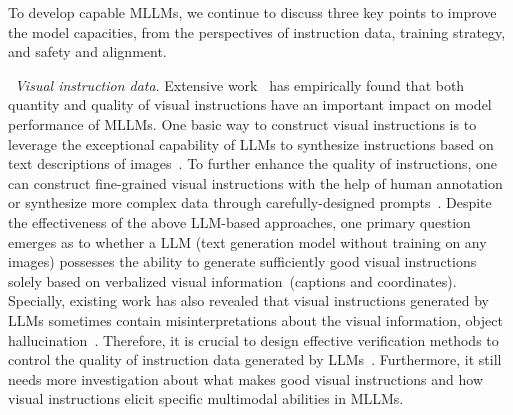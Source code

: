 {
To develop capable MLLMs, we continue to discuss three key points to improve the model capacities, from the perspectives of instruction data, training strategy, and safety and alignment.  

\textbullet~\emph{Visual instruction data}. 
{%
Extensive work~\cite{Liu-arxiv-2023-improved,Wang-arxiv-2023-To} has empirically found that both quantity and quality of visual instructions have an important impact on model performance of MLLMs. One basic way to construct visual instructions is to leverage the exceptional capability of LLMs to synthesize instructions  based on text descriptions of images~\cite{Liu-2023-arxiv-Visual}. %
To further enhance the quality of instructions, one can 
construct fine-grained visual instructions with the help of human annotation~\cite{Chen-arxiv-2023-shikra,Zhang-arxiv-2023-LLaVAR} or synthesize more complex data through carefully-designed prompts~\cite{Du-arxiv-2023-What}. 
Despite the effectiveness of the above LLM-based approaches, 
one primary question emerges as to whether a LLM (\ie text generation model without training on any images) possesses the ability to generate sufficiently good visual instructions solely based on verbalized visual information~(\eg captions and coordinates). Specially, existing work has also revealed that visual instructions generated by LLMs sometimes contain misinterpretations about the visual information, \eg object  hallucination~\cite{Li-emnlp-2023-evaluating}.  Therefore, it is crucial to design effective verification methods to control the quality of instruction data generated by LLMs~\cite{Du-arxiv-2023-What}. Furthermore, it still needs   more investigation about  what makes good visual instructions and how visual instructions elicit specific  multimodal abilities in  MLLMs. 
}

}
